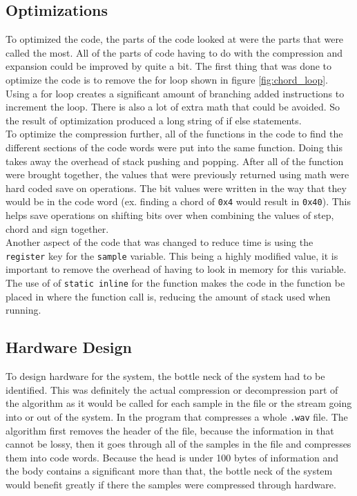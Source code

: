 \documentclass[12pt]{article}
\begin{document}
\subsection{Optimizations}

To optimized the code, the parts of the code looked at were the parts that were called the most. All of the parts of code having to do with the compression and expansion could be improved by quite a bit. The first thing that was done to optimize the code is to remove the for loop shown in figure \ref{fig:chord_loop}. Using a for loop creates a significant amount of branching added instructions to increment the loop. There is also a lot of extra math that could be avoided. So the result of optimization produced a long string of if else statements. \\

To optimize the compression further, all of the functions in the code to find the different sections of the code words were put into the same function. Doing this takes away the overhead of stack pushing and popping. After all of the function were brought together, the values that were previously returned using math were hard coded save on operations. The bit values were written in the way that they would be in the code word (ex. finding a chord of \texttt{0x4} would result in \texttt{0x40}). This helps save operations on shifting bits over when combining the values of step, chord and sign together. \\

Another aspect of the code that was changed to reduce time is using the \texttt{register} key for the  \texttt{sample} variable. This being a highly modified value, it is important to remove the overhead of having to look in memory for this variable. The use of of \texttt{static inline} for the function makes the code in the function be placed in where the function call is, reducing the amount of stack used when running.\\

\subsection{Hardware Design}

To design hardware for the system, the bottle neck of the system had to be identified. This was definitely the actual compression or decompression part of the algorithm as it would be called for each sample in the file or the stream going into or out of the system. In the program that compresses a whole \texttt{.wav} file. The algorithm first removes the header of the file, because the information in that cannot be lossy, then it goes through all of the samples in the file and compresses them into code words. Because the head is under 100 bytes of information and the body contains a significant more than that, the bottle neck of the system would benefit greatly if there the samples were compressed through hardware. \\
\end{document}
